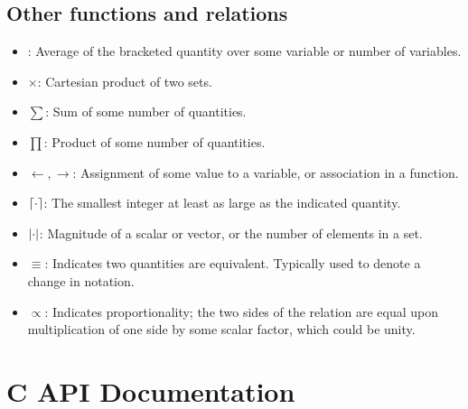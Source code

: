 \begin{appendix}
\subsection{Other functions and relations}
\begin{itemize}
\item \angles{\cdot}: Average of the bracketed quantity over some variable or number of variables.
\item $\times$: Cartesian product of two sets.
\item $\sum$: Sum of some number of quantities.
\item $\prod$: Product of some number of quantities.
\item $\leftarrow,\rightarrow$: Assignment of some value to a variable, or association in a function.
\item $\left\lceil \cdot\right\rceil$: The smallest integer at least as large as the indicated quantity.
\item $\left|\cdot\right|$: Magnitude of a scalar or vector, or the number of elements in a set.
\item $\equiv$: Indicates two quantities are equivalent. Typically used to denote a change in notation.
\item $\propto$: Indicates proportionality; the two sides of the relation are equal upon multiplication of one side by some scalar factor, which could be unity.
\end{itemize}

\section{C API Documentation}



\end{appendix}
